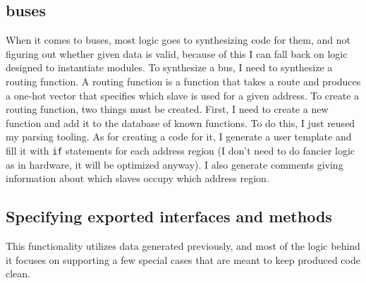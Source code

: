 \documentclass[12pt]{report}
\begin{document}
\subsection{buses}
When it comes to buses, most logic goes to synthesizing code for them, and not figuring out whether given data is valid, because of this I can fall back on logic designed to instantiate modules. To synthesize a bus, I need to synthesize a routing function.
A routing function is a function that takes a route and produces a one-hot vector that specifies which slave is used for a given address. 
To create a routing function, two things must be created. First, I need to create a new function and add it to the database of known functions. To do this, I just reused my parsing tooling. As for creating a code for it, I generate a user template and fill it with \verb!if! statements for each address region (I don't need to do fancier logic as in hardware, it will be optimized anyway). I also generate comments giving information about which slaves occupy which address region.

\subsection{Specifying exported interfaces and methods}
This functionality utilizes data generated previously, and most of the logic behind it focuses on supporting a few special cases that are meant to keep produced code clean.
\end{document}
